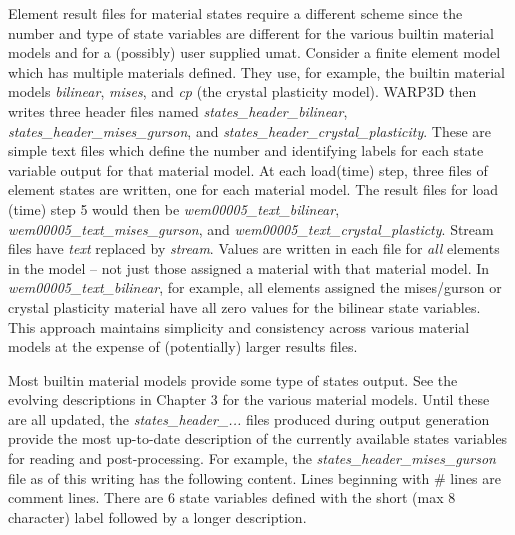 \documentclass[11pt]{report}
\numberwithin{equation}{section}
\newcommand{\ti}{\emph}
\begin{document}
Element result files for material states require a different scheme since the number and
type of state variables are different for the various builtin material models and for a
(possibly) user supplied umat. Consider a finite element model which has multiple materials defined. 
They use, for example, the builtin material models \ti{bilinear}, \ti{mises}, 
and \ti{cp} (the crystal plasticity model). 
WARP3D then writes three header files named  \ti{states\_header\_bilinear},
\ti{states\_header\_mises\_gurson}, and  \ti{states\_header\_crystal\_plasticity}.
These are simple text files which define the number and identifying labels
for each state variable output for that material model. At each load(time) step, three
files of element states are written, one for each material model.
The result files for load (time) step 5
would then be \ti{wem00005\_text\_bilinear}, \ti{wem00005\_text\_mises\_gurson},
and  \ti{wem00005\_text\_crystal\_plasticty}.  Stream files have \ti{text}
replaced by \ti{stream}. Values are written in each file for
\ti{all} elements in the model -- not just those assigned a material with that material model.
In \ti{wem00005\_text\_bilinear}, for example, all elements assigned the 
mises/gurson or crystal plasticity material have all zero values for the bilinear state
variables. This approach maintains simplicity and consistency across various material models at
the expense of (potentially) larger  results files.

Most builtin material models provide some type of states output. See the 
evolving descriptions in Chapter 3 for the
various material models. Until these are all updated, the \ti{states\_header\_...} files
produced during output generation provide the most up-to-date description of the currently available
states variables for reading and post-processing. For example, the 
\ti{states\_header\_mises\_gurson} file as of this writing has the following content. Lines 
beginning with \# lines are comment lines. There are 6 state variables  defined 
with the short (max 8 character) label
followed by a longer description.
\end{document}
